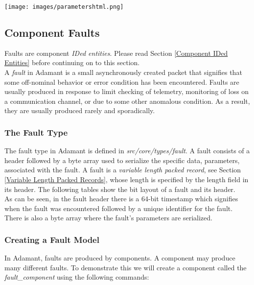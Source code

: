\vspace{5mm} %
\texttt{[image: images/parametershtml.png]}
\vspace{5mm} %

\subsection{Component Faults}

Faults are component \textit{IDed entities}. Please read Section \ref{Component IDed Entities} before continuing on to this section. \\

A \textit{fault} in Adamant is a small asynchronously created packet that signifies that some off-nominal behavior or error condition has been encountered. Faults are usually produced in response to limit checking of telemetry, monitoring of loss on a communication channel, or due to some other anomalous condition. As a result, they are usually produced rarely and sporadically.

\subsubsection{The Fault Type}

The fault type in Adamant is defined in \textit{src/core/types/fault}. A fault consists of a header followed by a byte array used to serialize the specific data, parameters, associated with the fault. A fault is a \textit{variable length packed record}, see Section \ref{Variable Length Packed Records}, whose length is specified by the length field in its header. The following tables show the bit layout of a fault and its header. \\




As can be seen, in the fault header there is a 64-bit timestamp which signifies when the fault was encountered followed by a unique identifier for the fault. There is also a byte array where the fault's parameters are serialized. \\

\subsubsection{Creating a Fault Model}

In Adamant, faults are produced by components. A component may produce many different faults. To demonstrate this we will create a component called the \textit{fault\_component} using the following commands:

